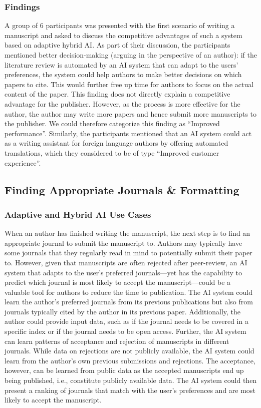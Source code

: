 \subsubsection*{Findings}
A group of 6 participants was presented with the first scenario of writing a manuscript and asked to discuss the competitive 
advantages of such a system based on adaptive hybrid AI. As part of their discussion, the participants mentioned better decision-making
(arguing in the perspective of an author): if the literature review is automated by an AI system that can adapt to the users' preferences, 
the system could help authors to make better decisions on which papers to cite. This would further free up time for authors
to focus on the actual content of the paper. This finding does not directly explain a competitive advantage for the
publisher. However, as the process is more effective for the author, the author may write more papers and hence submit 
more manuscripts to the publisher. We could therefore categorize this finding as ``Improved performance''. Similarly, the participants
mentioned that an AI system could act as a writing assistant for foreign language authors by offering automated translations, which 
they considered to be of type ``Improved customer experience''.



\subsection{Finding Appropriate Journals \& Formatting}

\subsubsection*{Adaptive and Hybrid AI Use Cases}

When an author has finished writing the manuscript, the next step is to find an appropriate journal to submit the manuscript to.
Authors may typically have some journals that they regularly read in mind to potentially submit their paper to. However, given that 
manuscripts are often rejected after peer-review, an AI system that adapts to the user's preferred journals---yet has the capability 
to predict which journal is most likely to accept the manuscript---could be a valuable tool for authors to reduce the time to publication.
The AI system could learn the author's preferred journals from its previous publications but also from journals typically cited by the author
in its previous paper. Additionally, the author could provide input data, such as if the journal needs to be covered in a specific
index or if the journal needs to be open access. Further, the AI system can learn patterns of acceptance and rejection of manuscripts
in different journals. While data on rejections are not publicly available, the AI system could learn from the author's own previous
submissions and rejections. The acceptance, however, can be learned from public data as the accepted manuscripts end up being published, 
i.e., constitute publicly available data. The AI system could then present a ranking of journals that match with the user's preferences
and are most likely to accept the manuscript.

